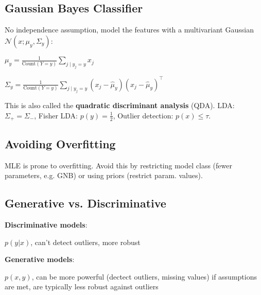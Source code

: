 \subsection*{Gaussian Bayes Classifier}

No independence assumption, model the features with a multivariant Gaussian $\mathcal{N}(x; \mu_y, \Sigma_y)$:

\quad $\mu_{y} = \frac{1}{\text{Count}(Y = y)} \sum_{j \; | \; y_j = y} x_{j}$

\quad $\Sigma_{y} = \frac{1}{\text{Count}(Y = y)} \sum_{j \; | \; y_j = y} (x_{j} - \hat \mu_{y}) (x_{j} - \hat \mu_{y})^\top$

This is also called the \textbf{quadratic discriminant analysis} (QDA). LDA: $\Sigma_+ = \Sigma_-$, Fisher LDA: $p(y) = \frac{1}{2}$, Outlier detection: $p(x) \leq \tau$.

\subsection*{Avoiding Overfitting}

MLE is prone to overfitting. Avoid this by restricting model class (fewer parameters, e.g. GNB) or using priors (restrict param. values).

\subsection*{Generative vs. Discriminative}

\textbf{Discriminative models}:

$p(y | x)$, can't detect outliers, more robust

\textbf{Generative models}:

$p(x,y)$, can be more powerful (dectect outliers, missing values) if assumptions are met, are typically less robust against outliers
